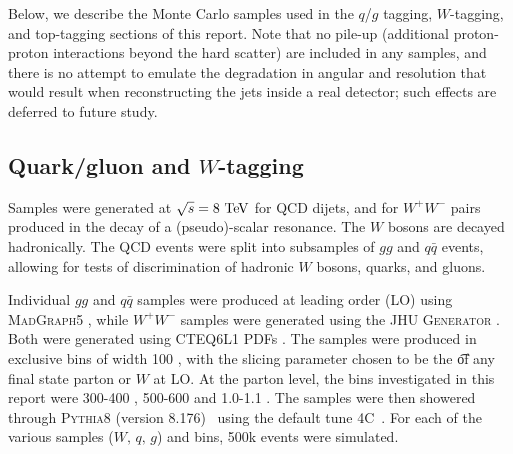 Below, we describe the Monte Carlo samples used in the $q$/$g$ tagging,
$W$-tagging, and top-tagging sections of this report. Note
that no pile-up (additional proton-proton
interactions beyond the hard scatter) are included in any samples, and there is no
attempt to emulate the degradation in angular and \pt resolution that
would result when reconstructing the jets inside a real detector; such effects are deferred to 
future study.


\subsection{Quark/gluon and $W$-tagging}

Samples were generated at $\sqrt{s} = 8\TeV$ for QCD dijets, and for $W^+W^-$
pairs produced in the decay of a (pseudo)-scalar resonance. The $W$ bosons are
decayed hadronically. The QCD events were split into subsamples of $gg$ and
$q\bar{q}$ events, allowing for tests of discrimination of hadronic $W$ bosons,
quarks, and gluons.

Individual $gg$ and $q\bar{q}$ samples were produced at leading order (LO)
using \textsc{MadGraph5} \cite{Alwall:2011uj}, while $W^+W^-$ samples were generated
using the \textsc{JHU Generator} \cite{Gao:2010qx,Bolognesi:2012mm,Anderson:2013afp}.
Both were generated using \textsc{CTEQ6L1} PDFs \cite{Pumplin:2002vw}. The samples
were produced in exclusive \pt bins of width 100 \GeV, with the slicing parameter
chosen to be the \t of any final state parton or $W$ at LO. At the parton level,
the \pt bins investigated in this report were 300-400 \GeV, 500-600 \GeV and
1.0-1.1 \TeV. 
The samples were then showered through \textsc{Pythia8}
(version 8.176)~\cite{Sjostrand:2007gs} using the default tune
4C~\cite{Buckley:2011ms}. For each of the various samples ($W,\,q,\,g$) and \pt bins,
500k events were simulated.





